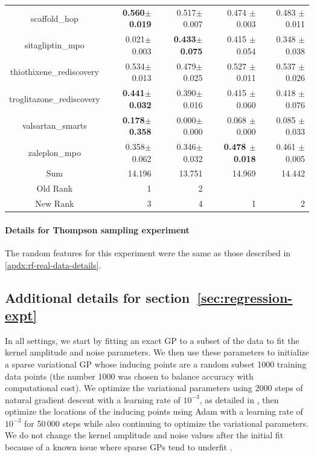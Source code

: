 \documentclass{article}
\theoremstyle{plain}
\theoremstyle{definition}
\theoremstyle{remark}
\begin{document}
\begin{table}
\begin{tabular}{c|rrrr}
    scaffold\_hop & \textbf{0.560$\pm$ 0.019} & 0.517$\pm$ 0.007 &0.474 $\pm$ 0.003&0.483 $\pm$ 0.011\\
    sitagliptin\_mpo & 0.021$\pm$ 0.003 & \textbf{0.433$\pm$ 0.075} &0.415 $\pm$ 0.054&0.348 $\pm$ 0.038\\
    thiothixene\_rediscovery & 0.534$\pm$ 0.013 & 0.479$\pm$ 0.025 &0.527 $\pm$ 0.011&0.537 $\pm$ 0.026\\
    troglitazone\_rediscovery & \textbf{0.441$\pm$ 0.032} & 0.390$\pm$ 0.016 &0.415 $\pm$ 0.060&0.418 $\pm$ 0.076\\
    valsartan\_smarts & \textbf{0.178$\pm$ 0.358} & 0.000$\pm$ 0.000 &0.068 $\pm$ 0.000&0.085 $\pm$ 0.033\\
    zaleplon\_mpo & 0.358$\pm$ 0.062 & 0.346$\pm$ 0.032 & \textbf{0.478 $\pm$ 0.018} &0.461 $\pm$ 0.005\\
    \midrule
    Sum & 14.196 & 13.751 &14.969& 14.442\\
    Old Rank & 1 & 2 &  & \\
    New Rank & 3 & 4 &1 & 2\\
    \bottomrule
  \end{tabular}
\end{table}

\paragraph{Details for Thompson sampling experiment}
The random features for this experiment were the same as those described in \ref{apdx:rf-real-data-details}.


\subsection{Additional details for section~\ref{sec:regression-expt}}\label{apdx:regression-expt-details}

In all settings, we start by fitting an exact GP to a subset of the data to fit the kernel amplitude and noise parameters.
We then use these parameters to initialize a sparse variational GP \citep{hensman2013gaussian} whose inducing points are a random subset 1000 training data points
(the number 1000 was chosen to balance accuracy with computational cost).
We optimize the variational parameters using 2000 steps of natural gradient descent with a learning rate of $10^{-3}$,
as detailed in \citet{hensman2013gaussian},
then optimize the locations of the inducing points
using Adam with a learning rate of $10^{-3}$ for 50\,000 steps
while also continuing to optimize the variational parameters.
We do not change the kernel amplitude and noise values after the initial fit because of a known issue where
sparse GPs tend to underfit \citep{van2019sparse}.
\end{document}
